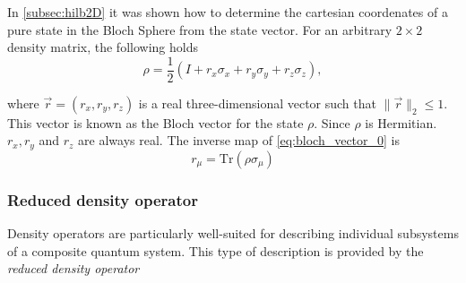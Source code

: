 In \autoref{subsec:hilb2D} it was shown how to determine the cartesian coordenates of a pure state in the Bloch Sphere from the state vector. For an arbitrary $2 \times 2$ density matrix, the following holds
\begin{equation} \label{eq:bloch_vector_0}
  \rho = \frac{1}{2}(I + r_{x}\sigma_{x} + r_{y}\sigma_{y} + r_{z}\sigma_{z}),
\end{equation} 

where $\vec{r} = (r_x, r_y, r_z)$ is a real three-dimensional vector such that $\| \vec{r} \|_2 \leq 1$. This vector is known as the Bloch vector for the state $\rho$. Since $\rho$ is Hermitian. $r_x, r_y$ and $r_z$ are always real.  The inverse map of \autoref{eq:bloch_vector_0} is
\begin{equation}
  \label{eq:Bloch_vector}
  r_{\mu} = \text{Tr}(\rho \sigma_{\mu})
  \end{equation}


\subsubsection{Reduced density operator}

Density operators are particularly well-suited for describing individual subsystems of a composite quantum system. This type of description is provided by the \emph{reduced density operator}

